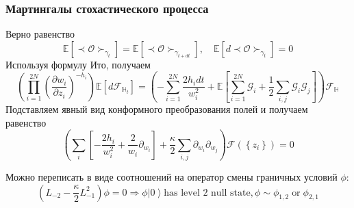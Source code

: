 \documentclass[pdftex]{beamer}
\theoremstyle{definition} \newtheorem{Def}{Определение}
\begin{document}
\begin{frame}
  \frametitle{Мартингалы стохастического процесса}
  Верно равенство
  \begin{equation*}
    \mathbb{E}\left[\prec\mathcal{O}\succ_{\gamma_{t}}\right]=    \mathbb{E}\left[\prec\mathcal{O}\succ_{\gamma_{t+dt}}\right], \quad \mathbb{E}\left[d \prec\mathcal{O}\succ_{\gamma_{t}}\right]=0
  \end{equation*}
  Используя формулу Ито, получаем
  \begin{equation*}
    \left(\prod_{i=1}^{2N}\left(\frac{\partial w_{i}}{\partial z_{i}}\right)^{-h_{i}}\right)\mathbb{E}\left[d 
      \mathcal{F}_{\mathbb{H}_{t}}\right]=\left(-\sum_{i=1}^{2N}\frac{2h_{i}dt}{w_{i}^{2}}+\mathbb{E}\left[\sum_{i=1}^{2N}\mathcal{G}_{i}+\frac{1}{2}
        \sum_{i,j}\mathcal{G}_{i}\mathcal{G}_{j}\right]\right)\mathcal{F}_{\mathbb{H}}
  \end{equation*}
  Подставляем явный вид конформного преобразования полей и получаем равенство
  \begin{equation*}
    \left( \sum_{i}\left[-\frac{2h_{i}}{w_{i}^{2}} +\frac{2}{w_{i}}\partial_{w_{i}}\right]+\frac{\kappa}{2}\sum_{i,j}\partial_{w_{i}} \partial_{w_{j}}\right)\mathcal{F}(\left\{z_{i}\right\})=0
  \end{equation*}

  Можно переписать в виде соотношений на оператор смены граничных условий $\phi$:
  \begin{equation*}
    (L_{-2}-\frac{\kappa}{2}L_{-1}^{2})\phi=0 \Longrightarrow \phi \left|0\right>  \text{has level 2 null state}, \phi\sim \phi_{1,2} \;\text{or}\; \phi_{2,1}
  \end{equation*}

\end{frame}
\end{document}
